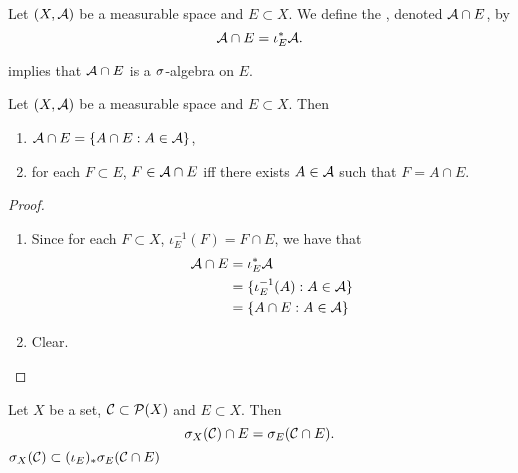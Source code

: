 \documentclass{book}
\begin{document}
	\begin{defn}  
		Let $(X, \mathcal{A})$ be a measurable space and $E \subset X$. We define the , denoted $\mathcal{A} \cap E$, by 
		$$\mathcal{A} \cap E = \iota_E^* \mathcal{A}.$$
	\end{defn}

	\begin{note}
		 implies that $\mathcal{A} \cap E$ is a $\sigma$-algebra on $E$. 
	\end{note}
	
	\begin{ex} 
		Let $(X, \mathcal{A})$ be a measurable space and $E \subset X$. Then 
		\begin{enumerate}
			\item $\mathcal{A} \cap E = \{A \cap E: A \in \mathcal{A} \}$,
			\item for each $F \subset E$, $F \in \mathcal{A} \cap E$ iff there exists $A \in \mathcal{A}$ such that $F = A \cap E$. 
		\end{enumerate}
	\end{ex}
	
	\begin{proof}\
		\begin{enumerate}
			\item Since for each $F \subset X$, $\iota_E^{-1}(F) = F \cap E$, we have that 
			\begin{align*}
				\mathcal{A} \cap E
				& = \iota_E^* \mathcal{A} \\
				& = \{\iota_E^{-1}(A): A \in \mathcal{A} \} \\
				& = \{ A \cap E: A \in \mathcal{A} \} \\
			\end{align*}
			\item Clear.
		\end{enumerate}
	\end{proof}

	

	\begin{ex}  
		Let $X$ be a set, $\mathcal{C} \subset \mathcal{P}(X)$ and $E \subset X$. Then 
		$$\sigma_X(\mathcal{C}) \cap E = \sigma_E(\mathcal{C} \cap E).$$ 
		 $\sigma_X(\mathcal{C}) \subset (\iota_E)_* \sigma_E(\mathcal{C} \cap E)$
	\end{ex}
	
\end{document}

